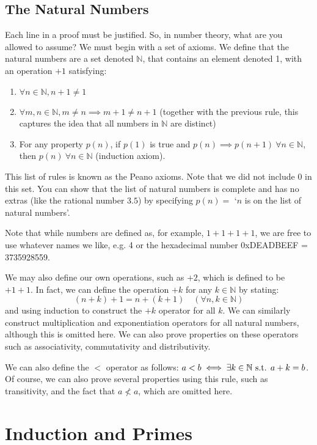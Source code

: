 \documentclass{article}
\begin{document}
	\subsection{The Natural Numbers}
	Each line in a proof must be justified. So, in number theory, what are you allowed to assume? We must begin with a set of axioms. We define that the natural numbers are a set denoted $\mathbb N$, that contains an element denoted 1, with an operation $+1$ satisfying:
	\begin{enumerate}
		\item $\forall n \in \mathbb N, n + 1 \neq 1$
		\item $\forall m,n \in \mathbb N, m \neq n \implies m+1 \neq n+1$ (together with the previous rule, this captures the idea that all numbers in $\mathbb N$ are distinct)
		\item For any property $p(n)$, if $p(1)$ is true and $p(n) \implies p(n+1) \ \forall n \in \mathbb N$, then $p(n) \ \forall n \in \mathbb N$ (induction axiom).
	\end{enumerate}

	\noindent This list of rules is known as the Peano axioms. Note that we did not include 0 in this set. You can show that the list of natural numbers is complete and has no extras (like the rational number $3.5$) by specifying $p(n)=$ `$n$ is on the list of natural numbers'. 
	
	Note that while numbers are defined as, for example, $1+1+1+1$, we are free to use whatever names we like, e.g. 4 or the hexadecimal number 0xDEADBEEF = 3735928559.
	
	We may also define our own operations, such as $+2$, which is defined to be $+1+1$. In fact, we can define the operation $+k$ for any $k \in \mathbb N$ by stating:
	\[ (n+k)+1 = n+(k+1) \quad(\forall n, k \in \mathbb N) \]
	\noindent and using induction to construct the $+k$ operator for all $k$. We can similarly construct multiplication and exponentiation operators for all natural numbers, although this is omitted here. We can also prove properties on these operators such as associativity, commutativity and distributivity.
	
	We can also define the $<$ operator as follows: $a < b \iff \exists k \in \mathbb N \text{ s.t. } a + k = b$. Of course, we can also prove several properties using this rule, such as transitivity, and the fact that $a \nless a$, which are omitted here.
	
	\section{Induction and Primes}
\end{document}
